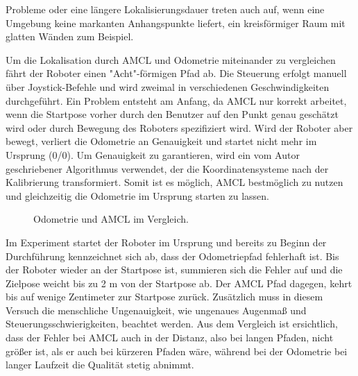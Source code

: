 \documentclass[11pt,a4paper]{article}
\begin{document}
{Probleme oder eine l\"angere Lokalisierungsdauer treten auch auf, wenn eine Umgebung keine markanten Anhangspunkte liefert, ein kreisf\"ormiger Raum mit glatten W\"anden zum Beispiel. 

Um die Lokalisation durch AMCL und Odometrie miteinander zu vergleichen f\"ahrt der Roboter einen "Acht"-f\"ormigen Pfad ab. Die Steuerung erfolgt manuell \"uber Joystick-Befehle und wird zweimal in verschiedenen Geschwindigkeiten durchgef\"uhrt. Ein Problem entsteht am Anfang, da AMCL nur korrekt arbeitet, wenn die Startpose vorher durch den Benutzer auf den Punkt genau gesch\"atzt wird oder durch Bewegung des Roboters spezifiziert wird.
Wird der Roboter aber bewegt, verliert die Odometrie an Genauigkeit und startet nicht mehr im Ursprung (0/0). Um Genauigkeit zu garantieren, wird ein vom Autor geschriebener Algorithmus verwendet, der die Koordinatensysteme nach der Kalibrierung transformiert. Somit ist es m\"oglich, AMCL bestm\"oglich zu nutzen und gleichzeitig die Odometrie im Ursprung starten zu lassen.

\begin{figure}[h]
	\centering
	\par\medskip
	\caption{ Odometrie und AMCL im Vergleich. }
\end{figure}




Im Experiment startet der Roboter im Ursprung und bereits zu Beginn der Durchf\"uhrung kennzeichnet sich ab, dass der Odometriepfad fehlerhaft ist. Bis der Roboter wieder an der Startpose ist, summieren sich die Fehler auf und die Zielpose weicht bis zu 2 m von der Startpose ab. Der AMCL Pfad dagegen, kehrt bis auf wenige Zentimeter zur Startpose zur\"uck. Zus\"atzlich muss in diesem Versuch die menschliche Ungenauigkeit, wie ungenaues Augenma{\ss} und Steuerungsschwierigkeiten, beachtet werden. Aus dem Vergleich ist ersichtlich, dass der Fehler bei AMCL auch in der Distanz, also bei langen Pfaden, nicht gr\"o{\ss}er ist, als er auch bei k\"urzeren Pfaden w\"are, w\"ahrend bei der Odometrie bei langer Laufzeit die Qualit\"at stetig abnimmt.


}
\end{document}
